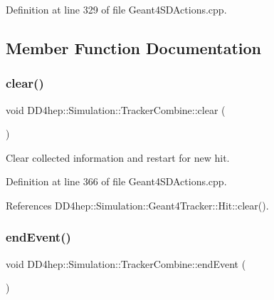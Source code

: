 Definition at line 329 of file Geant4\+S\+D\+Actions.\+cpp.



\subsection{Member Function Documentation}
\hypertarget{struct_d_d4hep_1_1_simulation_1_1_tracker_combine_a7b178cd57d961437d3cfabb65d9c2d09}{}\label{struct_d_d4hep_1_1_simulation_1_1_tracker_combine_a7b178cd57d961437d3cfabb65d9c2d09} 
\subsubsection{\texorpdfstring{clear()}{clear()}}
{\footnotesize\ttfamily void D\+D4hep\+::\+Simulation\+::\+Tracker\+Combine\+::clear (\begin{DoxyParamCaption}{ }\end{DoxyParamCaption})\hspace{0.3cm}{\ttfamily [inline]}}



Clear collected information and restart for new hit. 



Definition at line 366 of file Geant4\+S\+D\+Actions.\+cpp.



References D\+D4hep\+::\+Simulation\+::\+Geant4\+Tracker\+::\+Hit\+::clear().

\hypertarget{struct_d_d4hep_1_1_simulation_1_1_tracker_combine_a03b50811a7b164514baebc2f252fba62}{}\label{struct_d_d4hep_1_1_simulation_1_1_tracker_combine_a03b50811a7b164514baebc2f252fba62} 
\subsubsection{\texorpdfstring{end\+Event()}{endEvent()}}
{\footnotesize\ttfamily void D\+D4hep\+::\+Simulation\+::\+Tracker\+Combine\+::end\+Event (\begin{DoxyParamCaption}\item[{const G4\+Event $\ast$}]{ }\end{DoxyParamCaption})\hspace{0.3cm}{\ttfamily [inline]}}



